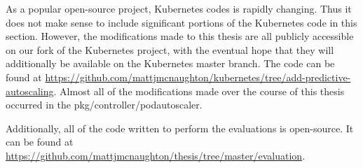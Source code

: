 As a popular open-source project, Kubernetes codes is rapidly changing. Thus it
does not make sense to include significant portions of the Kubernetes code in
this section. However, the modifications made to this thesis are all publicly
accessible on our fork of the Kubernetes project, with the eventual hope that
they will additionally be available on the Kubernetes master branch. The code
can be found at
\url{https://github.com/mattjmcnaughton/kubernetes/tree/add-predictive-autoscaling}.
Almost all of the modifications made over the course of this thesis occurred in
the pkg/controller/podautoscaler.

Additionally, all of the code written to perform the evaluations is open-source.
It can be found at
\url{https://github.com/mattjmcnaughton/thesis/tree/master/evaluation}.

